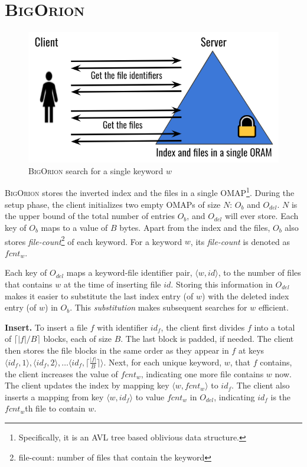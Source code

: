 \documentclass[sigconf]{acmart}
\newcommand{\pair}[2]{{\langle \ensuremath{#1, #2} \rangle}}
\newcommand{\vol}[1]{\lvert{#1}\rvert}
\newcommand{\ceil}[1]{\lceil #1 \rceil}
\newcommand{\BigOrion}{\textsc{BigOrion }}
\begin{document}
\section{\BigOrion}
\begin{figure}
\includegraphics[scale=.3]{pictures/borion.png}
\caption{\BigOrion search for a single keyword $w$}
\end{figure}
\BigOrion stores the inverted index and the files in a single OMAP\footnote{Specifically, it is an AVL tree based oblivious data structure.}. 
%
During the setup phase, the client initializes two empty OMAPs of size $N$: $O_b$ and $O_{del}$. 
%
$N$ is the upper bound of the total number of entries $O_b$, and $O_{del}$ will ever store. 
%
Each key of $O_b$ maps to a value of $B$ bytes.
%
Apart from the index and the files, $O_b$ also stores \emph{file-count}\footnote{file-count: number of files that contain the keyword} of each keyword.
%
For a keyword $w$, its \emph{file-count} is denoted as $fcnt_w$.
%




Each key of $O_{del}$ maps a keyword-file identifier pair, $\pair{w}{id}$, to the number of files that contains $w$ at the time of inserting file $id$. Storing this information in $O_{del}$ makes it easier to substitute the last index entry (of $w$) with the deleted index entry (of $w$) in $O_{b}$. This \emph{substitution} makes subsequent searches for $w$ efficient.



\noindent\textbf{Insert.} To insert a file $f$ with identifier $id_f$, the client first divides $f$ into a total of $\ceil{{\vol{f}}/{B}}$ blocks, each of size $B$. 
%
The last block is padded, if needed. 
%
The client then stores the file blocks in the same order as they appear in $f$ at keys $\pair{id_f}{1},\pair{id_f}{2}, \ldots \pair{id_f}{\ceil{\frac{\vol{f}}{B}}}$. 
%
Next, for each unique keyword, $w$, that $f$ contains, the client increases the value of  $fcnt_w$, indicating one more file contains $w$ now. The client updates the index by mapping key $\pair{w}{fcnt_w}$ to $id_f$.
%
The client also inserts a mapping from key $\pair{w}{id_f}$ to value $fcnt_w$ in $O_{del}$, indicating $id_f$ is the $fcnt_w$th file to contain $w$.
\end{document}
